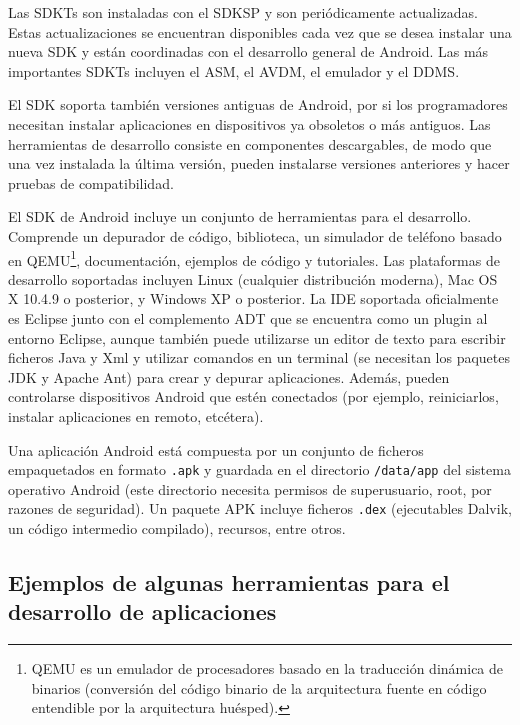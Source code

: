 Las \ac{SDKT}s son instaladas con el \ac{SDKSP} y son peri\'odicamente actualizadas. Estas actualizaciones se encuentran disponibles cada vez que se desea instalar una nueva \ac{SDK} y están coordinadas con el desarrollo general de Android. Las m\'as importantes \ac{SDKT}s incluyen el \ac{ASM}, el \ac{AVDM}, el emulador y el \ac{DDMS}.

El \ac{SDK} soporta tambi\'en versiones antiguas de Android, por si los programadores necesitan instalar aplicaciones en dispositivos ya obsoletos o m\'as antiguos. Las herramientas de desarrollo consiste en componentes descargables, de modo que una vez instalada la \'ultima versi\'on, pueden instalarse versiones anteriores y hacer pruebas de compatibilidad.

El \ac{SDK} de Android incluye un conjunto de herramientas para el desarrollo. Comprende un depurador de c\'odigo, biblioteca, un simulador de tel\'efono basado en QEMU\footnote{QEMU es un emulador de procesadores basado en la traducci\'on din\'amica de binarios (conversi\'on del c\'odigo binario de la arquitectura fuente en c\'odigo entendible por la arquitectura hu\'esped).}, documentaci\'on, ejemplos de c\'odigo y tutoriales. Las plataformas de desarrollo soportadas incluyen Linux (cualquier distribuci\'on moderna), Mac OS X\Si{\texttrademark} 10.4.9 o posterior, y Windows XP\Si{\texttrademark} o posterior. La \ac{IDE} soportada oficialmente es Eclipse\Si{\texttrademark} junto con el complemento \ac{ADT} que se encuentra como un plugin al entorno Eclipse\Si{\texttrademark}, aunque tambi\'en puede utilizarse un editor de texto para escribir ficheros Java y Xml y utilizar comandos en un terminal (se necesitan los paquetes \ac{JDK} y Apache Ant) para crear y depurar aplicaciones. Adem\'as, pueden controlarse dispositivos Android que est\'en conectados (por ejemplo, reiniciarlos, instalar aplicaciones en remoto, etc\'etera).~\cite{wiki.sdk}

Una aplicación Android est\'a compuesta por un conjunto de ficheros empaquetados en formato \texttt{.apk} y guardada en el directorio \texttt{/data/app} del sistema operativo Android (este directorio necesita permisos de superusuario, root, por razones de seguridad). Un paquete \ac{APK} incluye ficheros \texttt{.dex} (ejecutables Dalvik, un c\'odigo intermedio compilado), recursos, entre otros.

\subsection{Ejemplos de algunas herramientas para el desarrollo de aplicaciones}
\label{subsec:android.tools.examples.1}

